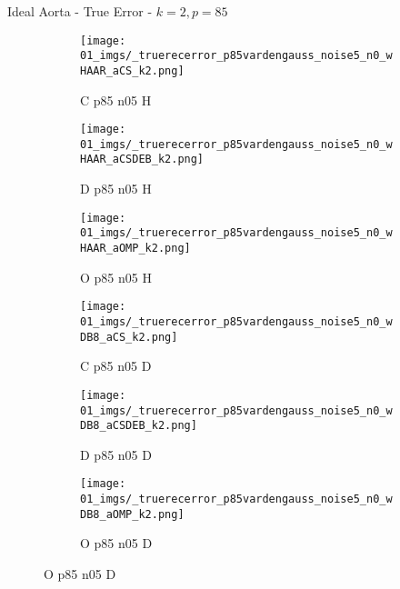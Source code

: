 \begin{frame}{Ideal Aorta - True Error - $k=2,p=85$}{}
\begin{figure}
\begin{subfigure}{0.13\textwidth}
\texttt{[image: 01\_imgs/\_truerecerror\_p85vardengauss\_noise5\_n0\_wHAAR\_aCS\_k2.png]}
\caption*{\tiny C p85 n05 H}
\end{subfigure}
\begin{subfigure}{0.13\textwidth}
\texttt{[image: 01\_imgs/\_truerecerror\_p85vardengauss\_noise5\_n0\_wHAAR\_aCSDEB\_k2.png]}
\caption*{\tiny D p85 n05 H}
\end{subfigure}
\begin{subfigure}{0.13\textwidth}
\texttt{[image: 01\_imgs/\_truerecerror\_p85vardengauss\_noise5\_n0\_wHAAR\_aOMP\_k2.png]}
\caption*{\tiny O p85 n05 H}
\end{subfigure}
\begin{subfigure}{0.13\textwidth}
\texttt{[image: 01\_imgs/\_truerecerror\_p85vardengauss\_noise5\_n0\_wDB8\_aCS\_k2.png]}
\caption*{\tiny C p85 n05 D}
\end{subfigure}
\begin{subfigure}{0.13\textwidth}
\texttt{[image: 01\_imgs/\_truerecerror\_p85vardengauss\_noise5\_n0\_wDB8\_aCSDEB\_k2.png]}
\caption*{\tiny D p85 n05 D}
\end{subfigure}
\begin{subfigure}{0.13\textwidth}
\texttt{[image: 01\_imgs/\_truerecerror\_p85vardengauss\_noise5\_n0\_wDB8\_aOMP\_k2.png]}
\caption*{\tiny O p85 n05 D}
\end{subfigure}

\vspace{5pt}


\end{figure}
\end{frame}
